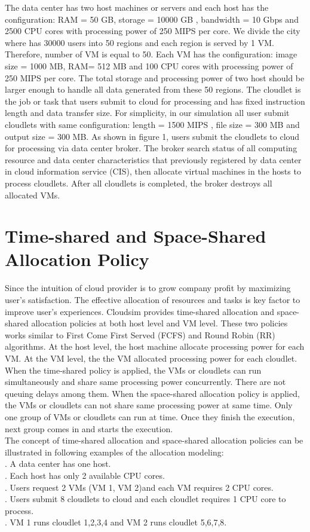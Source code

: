 \documentclass[12pt]{article}
\begin{document}
\indent The data center has two host machines or servers and each host has the configuration: RAM = 50 GB,  storage  = 10000 GB , bandwidth = 10 Gbps and  2500 CPU cores with processing power of 250 MIPS per core.  We divide the city where has 30000 users into 50 regions and each region is served by 1 VM.  Therefore, number of VM is equal to 50.  Each VM has the configuration: image size = 1000 MB, RAM= 512 MB and 100 CPU cores with processing power of 250 MIPS per core. The total storage and processing power of two host should be larger enough to handle all data  generated from these 50 regions.  The cloudlet is the  job or task that users submit to cloud for processing and has fixed instruction length and data transfer size. For simplicity, in our simulation all user submit cloudlets with same configuration: length = 1500 MIPS , file size = 300 MB and output size = 300 MB.
\indent As shown in figure 1, users submit the cloudlets to cloud for processing via data center broker.  The broker search status of all computing resource and data center characteristics that previously registered by data center in cloud information service (CIS), then allocate virtual machines in the hosts to process cloudlets. After all cloudlets is completed, the broker destroys all allocated VMs. 

\section{Time-shared and Space-Shared Allocation Policy}
Since the intuition of cloud provider is to grow company profit by maximizing user's satisfaction. The effective allocation of resources and tasks is key factor to improve user's experiences. Cloudsim provides time-shared allocation and space-shared allocation policies at both host level and VM level.  These two policies works similar to First Come
First Served (FCFS) and Round Robin (RR) algorithms\cite{ok3}. At the host level, the host machine allocate processing power for each VM.  At the VM level, the the VM allocated processing power for each cloudlet.  When the time-shared policy is applied, the VMs or cloudlets can run simultaneously and share same processing power concurrently. There are not queuing delays among them.  When the space-shared allocation policy is applied, the VMs or cloudlets can not share same processing power at same time. Only one group of VMs or cloudlets can run at time. Once they finish the execution, next group comes in and starts the execution.\\
\indent The concept of time-shared allocation and space-shared allocation policies can be illustrated in following examples of the allocation modeling:\\
. A data center has one host. \\
. Each host has only 2 available CPU cores.\\
. Users request 2 VMs (VM 1, VM 2)and each VM requires 2 CPU cores.\\
. Users submit 8 cloudlets to cloud and each cloudlet requires 1 CPU core to process. \\
. VM 1 runs cloudlet 1,2,3,4 and VM 2 runs cloudlet 5,6,7,8.
\end{document}
